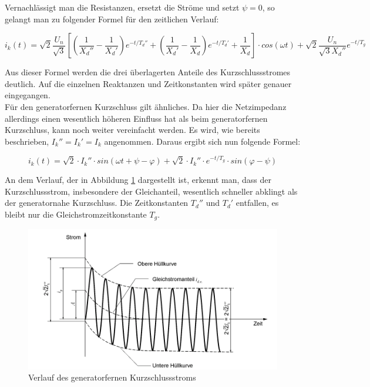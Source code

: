 \documentclass{scrartcl}
\begin{document}
\begin{onehalfspace}
Vernachlässigt man die Resistanzen, ersetzt die Ströme und setzt $\psi = 0$, so gelangt man zu folgender Formel für den zeitlichen Verlauf:

\begin{equation}
i_k(t) = \sqrt{2} \frac{U_n}{\sqrt{3}} [(\frac{1}{X_d''} - \frac{1}{X_d'}) e^{-t/T_d''} + (\frac{1}{X_d'} - \frac{1}{X_d}) e^{-t/T_d'} + \frac{1}{X_d}] \cdot cos(\omega t) + \sqrt{2} \frac{U_n}{\sqrt{3} X_d''} e^{-t/T_g}
\end{equation}

Aus dieser Formel werden die drei überlagerten Anteile des Kurzschlussstromes deutlich. Auf die einzelnen Reaktanzen und Zeitkonstanten wird später genauer eingegangen. \\

Für den generatorfernen Kurzschluss gilt ähnliches. Da hier die Netzimpedanz allerdings einen wesentlich höheren Einfluss hat als beim generatorfernen Kurzschluss, kann noch weiter vereinfacht werden. Es wird, wie bereits beschrieben, $I_k'' = I_k' = I_k$ angenommen. Daraus ergibt sich nun folgende Formel:

\begin{equation}
i_k(t) = \sqrt{2} \cdot I_k'' \cdot sin(\omega t + \psi - \varphi) + \sqrt{2} \cdot I_k'' \cdot e^{-t/T_g} \cdot sin(\varphi - \psi)
\end{equation}

An dem Verlauf, der in Abbildung \ref{kss-verlauf-fern} dargestellt ist, erkennt man, dass der Kurzschlussstrom, insbesondere der Gleichanteil, wesentlich schneller abklingt als der generatornahe Kurzschluss. Die Zeitkonstanten $T_d''$ und $T_d'$ entfallen, es bleibt nur die Gleichstromzeitkonstante $T_g$.

	\begin{figure}[H]
	\centering
	\includegraphics[scale=0.5]{img/generatorfern.png}
	\caption{Verlauf des generatorfernen Kurzschlussstroms}
	\label{kss-verlauf-fern}
	\end{figure}
	

\end{onehalfspace}
\end{document}
